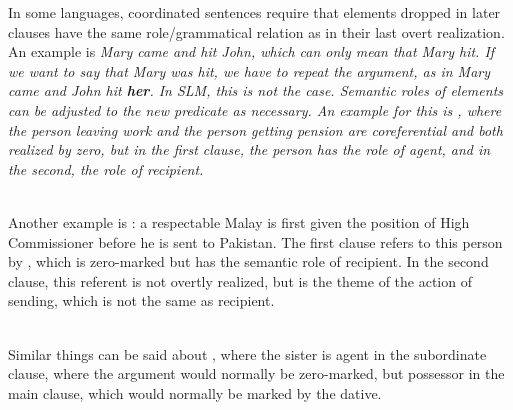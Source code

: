 In some languages, coordinated sentences require that elements dropped in later clauses have the same role/grammatical relation as in their last overt realization. An example is \em Mary came and hit John\em, which can only mean that Mary hit. If we want to say that Mary was hit, we have to repeat the argument, as in \em Mary came and John hit \textbf{her}\em.  In SLM, this is not the case. Semantic roles of elements can be adjusted to the new predicate as necessary. An example for this is , where the person leaving work and the person getting pension are coreferential and both realized by zero, but  in the first clause, the person has the role of agent, and in the second, the role of recipient.

 \\

Another example is : a respectable Malay is first given the position of High Commissioner before he is sent to Pakistan. The first clause refers to this person by , which is zero-marked but has the semantic role of recipient. In the second clause, this referent is not overtly realized, but is the theme of the action of sending, which is not the same as recipient.

 \\
Similar things can be said about , where the sister is agent in the subordinate clause, where the argument would normally be zero-marked, but possessor in the main clause, which would normally be marked by the dative.

